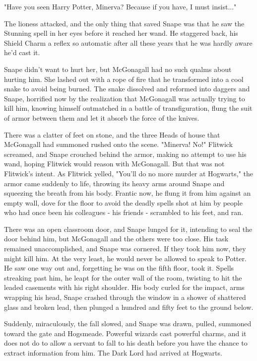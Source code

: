 "Have you seen Harry Potter, Minerva? Because if you have, I must insist..."

The lioness attacked, and the only thing that saved Snape was that he saw the Stunning spell in her eyes before it reached her wand. He staggered back, his Shield Charm a reflex so automatic after all these years that he was hardly aware he'd cast it.

Snape didn't want to hurt her, but McGonagall had no such qualms about hurting him. She lashed out with a rope of fire that he transformed into a cool snake to avoid being burned. The snake dissolved and reformed into daggers and Snape, horrified now by the realization that McGonagall was actually trying to kill him, knowing himself outmatched in a battle of transfiguration, flung the suit of armor between them and let it absorb the force of the knives.

There was a clatter of feet on stone, and the three Heads of house that McGonagall had summoned rushed onto the scene. "Minerva! No!" Flitwick screamed, and Snape crouched behind the armor, making no attempt to use his wand, hoping Flitwick would reason with McGonagall. But that was not Flitwick's intent. As Flitwick yelled, "You'll do no more murder at Hogwarts," the armor came suddenly to life, throwing its heavy arms around Snape and squeezing the breath from his body. Frantic now, he flung it from him against an empty wall, dove for the floor to avoid the deadly spells shot at him by people who had once been his colleagues - his friends - scrambled to his feet, and ran.

There was an open classroom door, and Snape lunged for it, intending to seal the door behind him, but McGonagall and the others were too close. His task remained unaccomplished, and Snape was cornered. If they took him now, they might kill him. At the very least, he would never be allowed to speak to Potter. He saw one way out and, forgetting he was on the fifth floor, took it. Spells streaking past him, he leapt for the outer wall of the room, twisting to hit the leaded casements with his right shoulder. His body curled for the impact, arms wrapping his head, Snape crashed through the window in a shower of shattered glass and broken lead, then plunged a hundred and fifty feet to the ground below.

Suddenly, miraculously, the fall slowed, and Snape was drawn, pulled, summoned toward the gate and Hogsmeade. Powerful wizards cast powerful charms, and it does not do to allow a servant to fall to his death before you have the chance to extract information from him. The Dark Lord had arrived at Hogwarts.

